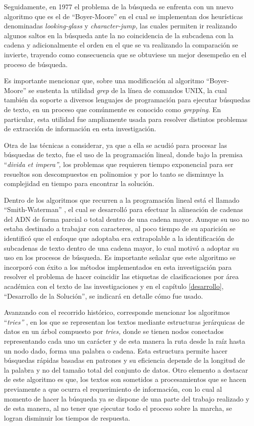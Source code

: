 \documentclass[
  12pt,
  openany]{book}
\begin{document}
Seguidamente, en 1977 el problema de la búsqueda se enfrenta con un nuevo algoritmo que es el de ``Boyer-Moore'' en el cual se implementan dos heurísticas denominadas \emph{looking-glass} y \emph{character-jump,} las cuales permiten ir realizando algunos saltos en la búsqueda ante la no coincidencia de la subcadena con la cadena y adicionalmente el orden en el que se va realizando la comparación se invierte, trayendo como consecuencia que se obtuviese un mejor desempeño en el proceso de búsqueda.

Es importante mencionar que, sobre una modificación al algoritmo ``Boyer-Moore'' se sustenta la utilidad \emph{grep} de la línea de comandos UNIX, la cual también da soporte a diversos lenguajes de programación para ejecutar búsquedas de texto, en un proceso que comúnmente es conocido como \emph{grepping}. En particular, esta utilidad fue ampliamente usada para resolver distintos problemas de extracción de información en esta investigación.

Otra de las técnicas a considerar, ya que a ella se acudió para procesar las búsquedas de texto, fue el uso de la programación lineal, donde bajo la premisa ``\emph{divida et impera'',} los problemas que requieren tiempo exponencial para ser resueltos son descompuestos en polinomios y por lo tanto se disminuye la complejidad en tiempo para encontrar la solución.

Dentro de los algoritmos que recurren a la programación lineal está el llamado ``Smith-Waterman'' \citep{smith1981}, el cual se desarrolló para efectuar la alineación de cadenas del ADN de forma parcial o total dentro de una cadena mayor. Aunque su uso no estaba destinado a trabajar con caracteres, al poco tiempo de su aparición se identificó que el enfoque que adoptaba era extrapolable a la identificación de subcadenas de texto dentro de una cadena mayor, lo cual motivó a adoptar su uso en los procesos de búsqueda. Es importante señalar que este algoritmo se incorporó con éxito a los métodos implementados en esta investigación para resolver el problema de hacer coincidir las etiquetas de clasificaciones por área académica con el texto de las investigaciones y en el capítulo \ref{desarrollo}, ``Desarrollo de la Solución'', se indicará en detalle cómo fue usado.

Avanzando con el recorrido histórico, corresponde mencionar los algoritmos ``\emph{tries''} \citep{aho1975}, en los que se representan los textos mediante estructuras jerárquicas de datos en un árbol compuesto por \emph{tries,} donde se tienen nodos conectados representando cada uno un carácter y de esta manera la ruta desde la raíz hasta un nodo dado, forma una palabra o cadena. Esta estructura permite hacer búsquedas rápidas basadas en patrones y su eficiencia depende de la longitud de la palabra y no del tamaño total del conjunto de datos. Otro elemento a destacar de este algoritmo es que, los textos son sometidos a procesamientos que se hacen previamente a que ocurra el requerimiento de información, con lo cual al momento de hacer la búsqueda ya se dispone de una parte del trabajo realizado y de esta manera, al no tener que ejecutar todo el proceso sobre la marcha, se logran disminuir los tiempos de respuesta.
\end{document}

